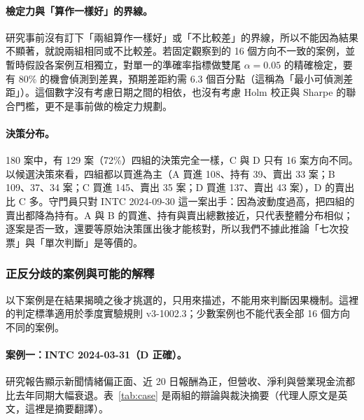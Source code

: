 \documentclass[12pt,a4paper]{article}
\numberwithin{table}{section}
\numberwithin{figure}{section}
\newcommand{\grp}[1]{\textsf{#1}}
\begin{document}
\paragraph{檢定力與「算作一樣好」的界線。} 研究事前沒有訂下「兩組算作一樣好」或「不比較差」的界線，所以不能因為結果不顯著，就說兩組相同或不比較差。若固定觀察到的 16 個方向不一致的案例，並暫時假設各案例互相獨立，對單一的準確率指標做雙尾 $\alpha=0.05$ 的精確檢定，要有 80\% 的機會偵測到差異，預期差距約需 6.3 個百分點（這稱為「最小可偵測差距」）。這個數字沒有考慮日期之間的相依，也沒有考慮 Holm 校正與 Sharpe 的聯合門檻，更不是事前做的檢定力規劃。

\paragraph{決策分布。} 180 案中，有 129 案（72\%）四組的決策完全一樣，\grp{C} 與 \grp{D} 只有 16 案方向不同。以候選決策來看，四組都以買進為主（\grp{A} 買進 108、持有 39、賣出 33 案；\grp{B} 109、37、34 案；\grp{C} 買進 145、賣出 35 案；\grp{D} 買進 137、賣出 43 案），\grp{D} 的賣出比 \grp{C} 多。守門員只對 INTC 2024-09-30 這一案出手：因為波動度過高，把四組的賣出都降為持有。\grp{A} 與 \grp{B} 的買進、持有與賣出總數接近，只代表整體分布相似；逐案是否一致，還要等原始決策匯出後才能核對，所以我們不據此推論「七次投票」與「單次判斷」是等價的。
\subsubsection{正反分歧的案例與可能的解釋}

以下案例是在結果揭曉之後才挑選的，只用來描述，不能用來判斷因果機制。這裡的判定標準適用於季度實驗規則 v3-1002.3；少數案例也不能代表全部 16 個方向不同的案例。
\paragraph{案例一：INTC 2024-03-31（\grp{D} 正確）。} 研究報告顯示新聞情緒偏正面、近 20 日報酬為正，但營收、淨利與營業現金流都比去年同期大幅衰退。表~\ref{tab:case} 是兩組的辯論與裁決摘要（代理人原文是英文，這裡是摘要翻譯）。
\end{document}
